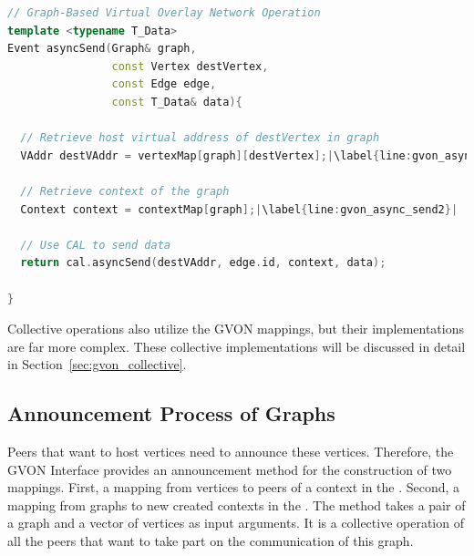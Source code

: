 \begin{minipage}[t]{\textwidth} 
\begin{lstlisting}[language=C++, label=lst:comm_gvon, caption={The \cpp{vertexMap} is used to translate vertices to virtual addresses and the \cpp{graphMap} is used to translate graphs to contexts. The communication operation is performed by the the CAL.}, escapechar=| ]
// Graph-Based Virtual Overlay Network Operation  
template <typename T_Data>
Event asyncSend(Graph& graph, 
                const Vertex destVertex, 
                const Edge edge, 
                const T_Data& data){ 

  // Retrieve host virtual address of destVertex in graph
  VAddr destVAddr = vertexMap[graph][destVertex];|\label{line:gvon_async_send1}|

  // Retrieve context of the graph
  Context context = contextMap[graph];|\label{line:gvon_async_send2}|

  // Use CAL to send data
  return cal.asyncSend(destVAddr, edge.id, context, data);

}
\end{lstlisting}
\end{minipage}

\noindent Collective operations also utilize the GVON mappings, but their
implementations are far more complex. These collective implementations will be
discussed in detail in Section~\ref{sec:gvon_collective}.


\subsection{Announcement Process of Graphs}
\label{sec:announcement_impl}

Peers that want to host vertices need to announce these vertices.
Therefore, the GVON Interface provides an announcement method for the
construction of two mappings. First, a mapping from vertices to peers
of a context in the . Second, a mapping from graphs to
new created contexts in the .  The method takes a pair
of a graph and a vector of vertices as input arguments.  It is a
collective operation of all the peers that want to take part on the
communication of this graph.

